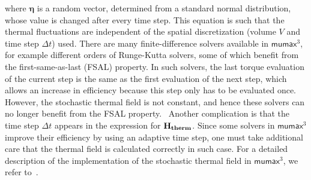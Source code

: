 \documentclass[11pt,a4paper,english]{article}
\renewcommand{\vec}[1]{\boldsymbol{#1}}
\newcommand{\mumax}{$\mathsf{mumax}^3$}
\begin{document}
where $\vec{\eta}$ is a random vector, determined from a standard normal distribution, whose value is changed after every time step. This equation is such that the thermal fluctuations are independent of the spatial discretization (volume $V$ and time step $\Delta t$) used.
There are many finite-difference solvers available in \mumax{}, for example different orders of Runge-Kutta solvers, some of which benefit from the first-same-as-last (FSAL) property. In such solvers, the last torque evaluation of the current step is the same as the first evaluation of the next step, which allows an increase in efficiency because this step only has to be evaluated once. However, the stochastic thermal field is not constant, and hence these solvers can no longer benefit from the FSAL property.~\cite{LEL-17b} Another complication is that the time step $\Delta t$ appears in the expression for $\vb{H_{therm}}$. Since some solvers in \mumax{} improve their efficiency by using an adaptive time step, one must take additional care that the thermal field is calculated correctly in such case. For a detailed description of the implementation of the stochastic thermal field in \mumax{}, we refer to~\cite{LEL-17b}.

\clearpage
\end{document}
